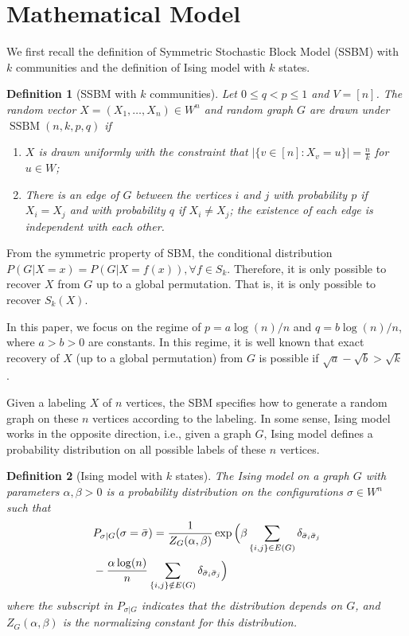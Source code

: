 \documentclass[conference]{IEEEtran}
\newtheorem{definition}{Definition}%
\DeclareMathOperator{\SSBM}{SSBM}
\newcommand{\ide}[2]{ \delta_{#1 #2} }
\begin{document}
\section{Mathematical Model} \label{s:Preliminaries}
We first recall the definition of Symmetric Stochastic Block Model (SSBM) with $k$ communities \cite{Abbe17} and the definition of Ising model with $k$ states.
\begin{definition}[SSBM with $k$ communities] \label{def:SSBM}
Let $0\leq q<p\leq 1$ and $V=[n]$. The random vector $X=(X_1,\dots,X_n)\in W^n$ and random graph $G$ are drawn under $\SSBM(n,k,p,q)$ if
\begin{enumerate}
\item $X$ is drawn uniformly with the constraint that $|\{v \in [n] : X_v = u\}| = \frac{n}{k}$ for $u\in W$;

\item There is an edge of $G$ between the vertices $i$ and $j$ with probability $p$ if $X_i=X_j$ and with probability $q$ if $X_i \neq X_j$; the existence of each edge is independent with each other.
\end{enumerate}
\end{definition}
From the symmetric property of SBM, the conditional distribution $P(G|X=x) = P(G|X=f(x)), \forall f \in S_k$. Therefore, it is only possible to recover $X$ from $G$ up to a global permutation. That is, it is only possible to recover $S_k(X)$.

In this paper, we focus on the regime of $p=a\log(n)/n$ and $q=b\log(n)/n$, where $a>b> 0$ are constants. In this regime, it is well known that exact recovery of $X$ (up to a global permutation) from $G$ is possible if $\sqrt{a}-\sqrt{b} > \sqrt{k}$ \cite{abbe2015community}.
 
Given a labeling $X$ of $n$ vertices, the SBM specifies how to generate a random graph on these $n$ vertices according to the labeling. In some sense, Ising model works in the opposite direction, i.e., given a graph $G$, Ising model defines a probability distribution on all possible labels of these $n$ vertices. 

 
\begin{definition}[Ising model with $k$ states]
The Ising model on a graph $G$ with parameters $\alpha,\beta>0$ is a probability distribution on the configurations $\sigma\in W^n$ such that
\begin{align} \label{eq:isingma}
&P_{\sigma|G}(\sigma=\bar{\sigma})=\frac{1}{Z_G(\alpha,\beta)}
\exp\Big(\beta \sum_{\{i,j\}\in E(G)} \ide{\bar{\sigma}_i}{\bar{\sigma}_j}\notag\\
&-\frac{\alpha\log(n)}{n} \sum_{\{i,j\}\notin E(G)} \ide{\bar{\sigma}_i}{\bar{\sigma}_j}
\Big)
\end{align}
where the subscript in $P_{\sigma|G}$ indicates that the distribution depends on $G$, and
$Z_G(\alpha,\beta)$ is the normalizing constant for this distribution.
\end{definition}
\end{document}
